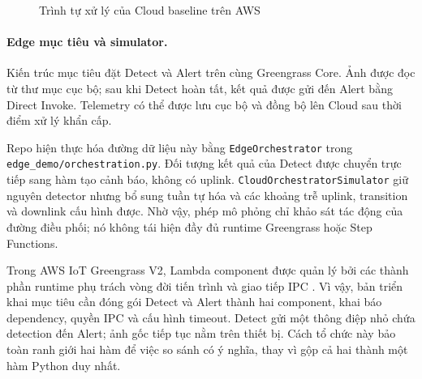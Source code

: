 \begin{figure}[htbp]
{
    }
    \caption{Trình tự xử lý của Cloud baseline trên AWS}
    \label{fig:cloud-baseline-sequence}
\end{figure}

\paragraph{Edge mục tiêu và simulator.}

Kiến trúc mục tiêu đặt Detect và Alert trên cùng Greengrass Core. Ảnh được đọc từ
thư mục cục bộ; sau khi Detect hoàn tất, kết quả được gửi đến Alert bằng Direct
Invoke. Telemetry có thể được lưu cục bộ và đồng bộ lên Cloud sau thời điểm xử lý
khẩn cấp.

Repo hiện thực hóa đường dữ liệu này bằng \texttt{EdgeOrchestrator} trong
\texttt{edge\_demo/orchestration.py}. Đối tượng kết quả của Detect được chuyển trực
tiếp sang hàm tạo cảnh báo, không có uplink. \texttt{CloudOrchestratorSimulator}
giữ nguyên detector nhưng bổ sung tuần tự hóa và các khoảng trễ uplink, transition
và downlink cấu hình được. Nhờ vậy, phép mô phỏng chỉ khảo sát tác động của đường
điều phối; nó không tái hiện đầy đủ runtime Greengrass hoặc Step Functions.

Trong AWS IoT Greengrass V2, Lambda component được quản lý bởi các thành phần
runtime phụ trách vòng đời tiến trình và giao tiếp IPC \cite{awsGreengrassLambda}.
Vì vậy, bản triển khai mục tiêu cần đóng gói Detect và Alert thành hai component,
khai báo dependency, quyền IPC và cấu hình timeout. Detect gửi một thông điệp nhỏ
chứa detection đến Alert; ảnh gốc tiếp tục nằm trên thiết bị. Cách tổ chức này bảo
toàn ranh giới hai hàm để việc so sánh có ý nghĩa, thay vì gộp cả hai thành một hàm
Python duy nhất.

